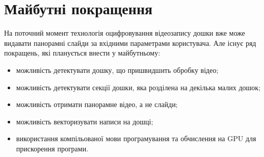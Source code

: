 \section{Майбутні покращення}

На поточний момент технологія оцифровування відеозапису дошки вже може
видавати панорамні слайди за вхідними параметрами користувача. Але існує
ряд покращень, які планується внести у майбутньому:
\begin{itemize}
      \item можливість детектувати дошку, що пришвидшить обробку відео;
      \item можливість детектувати секції дошки, яка розділена на декілька малих дошок;
      \item можливість отримати панорамне відео, а не слайди;
      \item можливість векторизувати написи на дошці;
      \item використання компільованої мови програмування та обчислення на GPU \cite{bib:cuda,bib:opencl} для
            прискорення програми.
\end{itemize}

\clearpage
